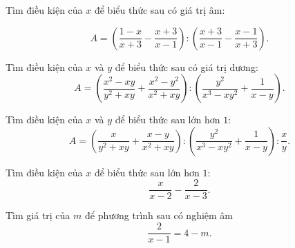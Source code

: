 \begin{bt}%
	Tìm điều kiện của $ x $ để biểu thức sau có giá trị âm:

\[ A=\left(\dfrac{1-x}{x+3} -\dfrac{x+3}{x-1}\right):\left(\dfrac{x+3}{x-1}-\dfrac{x-1}{x+3}\right).\]
\end{bt}


\begin{bt}%
	Tìm điều kiện của $ x $ và $ y $ để biểu thức sau có giá trị dương:
	\[ A=\left(\dfrac{x^2-xy}{y^2+xy} +\dfrac{x^2-y^2}{x^2+xy}\right):\left(\dfrac{y^2}{x^3-xy^2}+\dfrac{1}{x-y}\right).\]
\end{bt}

\begin{bt}%
	Tìm điều kiện của $ x $ và $ y $ để biểu thức sau lớn hơn $ 1 $:
	\[ A=\left(\dfrac{x}{y^2+xy} +\dfrac{x-y}{x^2+xy}\right):\left(\dfrac{y^2}{x^3-xy^2}+\dfrac{1}{x-y}\right):\dfrac{x}{y}.\]
\end{bt}

\begin{bt}%
	Tìm điều kiện của $ x $ để biểu thức sau lớn hơn $ 1 $:
	\[
	\dfrac{x}{x-2}-\dfrac{2}{x-3}.
	\] 
\end{bt}

\begin{bt}%
	Tìm giá trị của $ m $ để phương trình sau có nghiệm âm
	\[
	\dfrac{2}{x-1}=4-m.
	\] 
\end{bt}